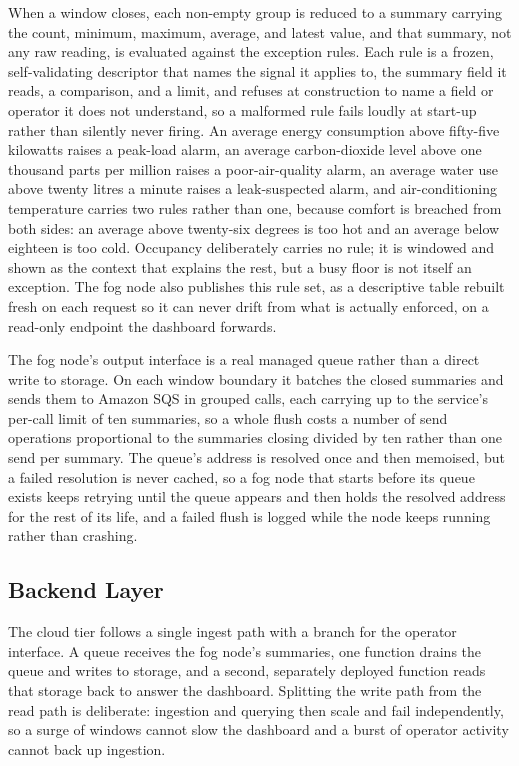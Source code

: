 \documentclass[conference]{IEEEtran}
\begin{document}
When a window closes, each non-empty group is reduced to a summary carrying the count, minimum, maximum, average, and latest value, and that summary, not any raw reading, is evaluated against the exception rules. Each rule is a frozen, self-validating descriptor that names the signal it applies to, the summary field it reads, a comparison, and a limit, and refuses at construction to name a field or operator it does not understand, so a malformed rule fails loudly at start-up rather than silently never firing. An average energy consumption above fifty-five kilowatts raises a peak-load alarm, an average carbon-dioxide level above one thousand parts per million raises a poor-air-quality alarm, an average water use above twenty litres a minute raises a leak-suspected alarm, and air-conditioning temperature carries two rules rather than one, because comfort is breached from both sides: an average above twenty-six degrees is too hot and an average below eighteen is too cold. Occupancy deliberately carries no rule; it is windowed and shown as the context that explains the rest, but a busy floor is not itself an exception. The fog node also publishes this rule set, as a descriptive table rebuilt fresh on each request so it can never drift from what is actually enforced, on a read-only endpoint the dashboard forwards.

The fog node's output interface is a real managed queue rather than a direct write to storage. On each window boundary it batches the closed summaries and sends them to Amazon SQS in grouped calls, each carrying up to the service's per-call limit of ten summaries, so a whole flush costs a number of send operations proportional to the summaries closing divided by ten rather than one send per summary. The queue's address is resolved once and then memoised, but a failed resolution is never cached, so a fog node that starts before its queue exists keeps retrying until the queue appears and then holds the resolved address for the rest of its life, and a failed flush is logged while the node keeps running rather than crashing.

\subsection{Backend Layer}

The cloud tier follows a single ingest path with a branch for the operator interface. A queue receives the fog node's summaries, one function drains the queue and writes to storage, and a second, separately deployed function reads that storage back to answer the dashboard. Splitting the write path from the read path is deliberate: ingestion and querying then scale and fail independently, so a surge of windows cannot slow the dashboard and a burst of operator activity cannot back up ingestion.
\end{document}
